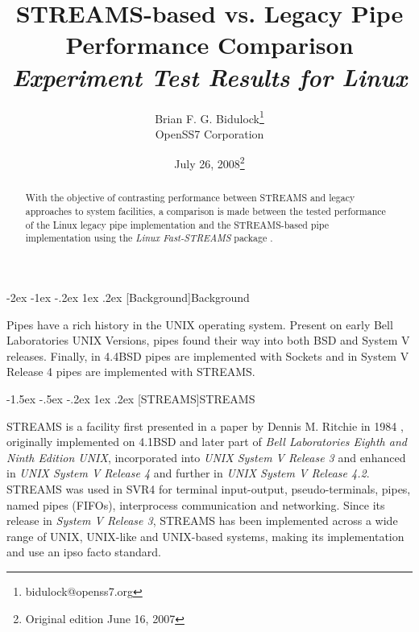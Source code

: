 \documentclass[letterpaper,final,notitlepage,twocolumn,10pt,twoside]{article}
\makeatletter
\renewcommand\section{\@startsection {section}{1}{\z@}%
                                   {-2ex \@plus -1ex \@minus -.2ex}%
                                   {1ex \@plus .2ex}%
                                   {\normalfont\large\bfseries}}
\renewcommand\subsection{\@startsection{subsection}{2}{\z@}%
                                     {-1.5ex \@plus -.5ex \@minus -.2ex}%
                                     {1ex \@plus .2ex}%
                                     {\normalfont\normalsize\bfseries}}
\makeatother
\begin{document}

\title{STREAMS-based vs. Legacy Pipe Performance Comparison\\[0.5ex]
	{\large \textsl{Experiment Test Results for Linux}}}
\author{Brian F. G. Bidulock\thanks{bidulock@openss7.org}\\
	OpenSS7 Corporation}
\date{July 26, 2008\thanks{Original edition June 16, 2007}}
\maketitle

\begin{abstract}
With the objective of contrasting performance between STREAMS and legacy approaches to system
facilities, a comparison is made between the tested performance of the Linux legacy pipe
implementation and the STREAMS-based pipe
implementation using the \textsl{Linux Fast-STREAMS} package \cite[]{LfS}.
\end{abstract}


\section[Background]{Background}

Pipes have a rich history in the UNIX operating system.  Present on early Bell Laboratories UNIX
Versions, pipes found their way into both BSD and System V releases.  Finally, in 4.4BSD pipes are
implemented with Sockets and in System V Release 4 pipes are implemented with STREAMS.

\subsection[STREAMS]{STREAMS}

STREAMS is a facility first presented in a paper by Dennis M. Ritchie in 1984 \cite[]{Ritchie84},
originally implemented on 4.1BSD and later part of \textsl{Bell Laboratories Eighth and Ninth Edition UNIX},
incorporated into \textsl{UNIX System V Release 3} and enhanced in \textsl{UNIX System V Release 4}
and further in \textsl{UNIX System V Release 4.2}.  STREAMS was used in SVR4 for terminal
input-output, pseudo-terminals, pipes, named pipes (FIFOs), interprocess communication and
networking.  Since its release in
\textsl{System V Release 3}, STREAMS has been implemented across a wide range of UNIX, UNIX-like and
UNIX-based systems, making its implementation and use an ipso facto standard.
\end{document}
